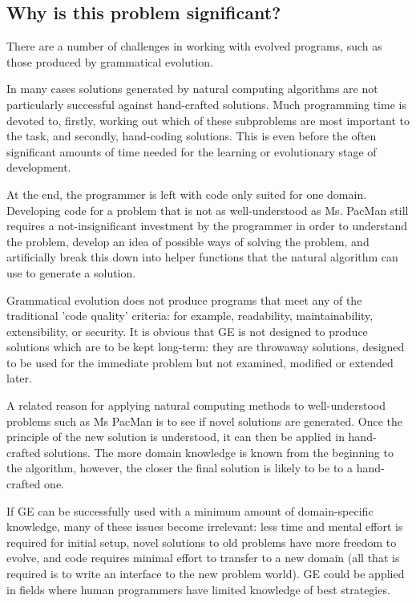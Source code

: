 \documentclass[a4paper,12pt]{article}
\begin{document}
\subsection*{Why is this problem significant?}

There are a number of challenges in working with evolved programs, such as those produced by grammatical evolution.

In many cases solutions generated by natural computing algorithms are not particularly successful against hand-crafted solutions. Much programming time is devoted to, firstly, working out which of these subproblems are most important to the task, and secondly, hand-coding solutions. This is even before the often significant amounts of time needed for the learning or evolutionary stage of development.  

At the end, the programmer is left with code only suited for one domain. Developing code for a problem that is not as well-understood as Ms. PacMan still requires a not-insignificant investment by the programmer in order to understand the problem, develop an idea of possible ways of solving the problem, and artificially break this down into helper functions that the natural algorithm can use to generate a solution.

Grammatical evolution does not produce programs that meet any of the traditional 'code quality' criteria: for example, readability, maintainability, extensibility, or security. It is obvious that GE is not designed to produce solutions which are to be kept long-term: they are throwaway solutions, designed to be used for the immediate problem but not examined, modified or extended later.

A related reason for applying natural computing methods to well-understood problems such as Ms PacMan is to see if novel solutions are generated. Once the principle of the new solution is understood, it can then be applied in hand-crafted solutions. The more domain knowledge is known from the beginning to the algorithm, however, the closer the final solution is likely to be to a hand-crafted one. 

If GE can be successfully used with a minimum amount of domain-specific knowledge, many of these issues become irrelevant: less time and mental effort is required for initial setup, novel solutions to old problems have more freedom to evolve, and code requires minimal effort to transfer to a new domain (all that is required is to write an interface to the new problem world). GE could be applied in fields where human programmers have limited knowledge of best strategies.
\end{document}

